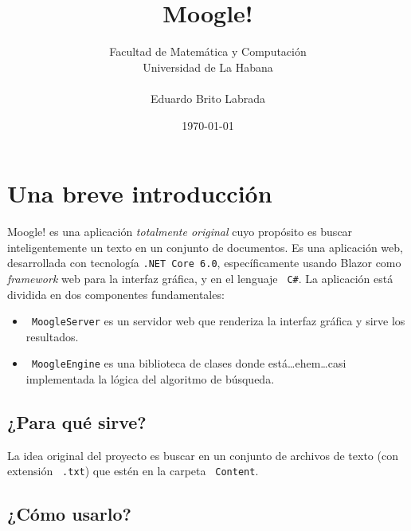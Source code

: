 \documentclass[a4paper, 12pt]{article}
\begin{document}
\title{{\bf \LARGE Moogle!}}
\author{Facultad de Matemática y Computación \\ Universidad de La Habana \\ \\ Eduardo Brito Labrada}
\date{\today}

\maketitle

\tableofcontents

\section*{Una breve introducción}


Moogle! es una aplicación {\it totalmente original} cuyo propósito es buscar
inteligentemente un texto en un conjunto de documentos. Es una aplicación web,
desarrollada con tecnología {\tt \color{gray45}.NET Core 6.0}, específicamente
usando Blazor como {\it framework} web para la interfaz gráfica, y en el
lenguaje {\tt \color{gray45} C\#}. La aplicación está dividida en dos
componentes fundamentales:

\begin{itemize}
	\item {\tt \color{gray45} MoogleServer} es un servidor web que renderiza la interfaz gráfica y sirve los resultados.
	\item {\tt \color{gray45} MoogleEngine} es una biblioteca de clases donde está\dots ehem\dots casi implementada la lógica del algoritmo de búsqueda.
\end{itemize}

\subsection*{¿Para qué sirve?}

La idea original del proyecto es buscar en un conjunto de archivos de texto
(con extensión {\tt \color{gray45} .txt}) que estén en la carpeta {\tt
		\color{gray45}Content}.

\subsection*{¿Cómo usarlo?}
\end{document}
